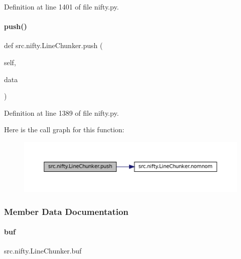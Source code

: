 Definition at line 1401 of file nifty.\+py.

\mbox{\label{classsrc_1_1nifty_1_1LineChunker_ad40b3d34790aa79d65c2e6984d936f16}} 
\paragraph{\texorpdfstring{push()}{push()}}
{\footnotesize\ttfamily def src.\+nifty.\+Line\+Chunker.\+push (\begin{DoxyParamCaption}\item[{}]{self,  }\item[{}]{data }\end{DoxyParamCaption})}



Definition at line 1389 of file nifty.\+py.

Here is the call graph for this function\+:
\nopagebreak
\begin{figure}[H]
\begin{center}
\leavevmode
\includegraphics[width=350pt]{classsrc_1_1nifty_1_1LineChunker_ad40b3d34790aa79d65c2e6984d936f16_cgraph}
\end{center}
\end{figure}


\subsubsection{Member Data Documentation}
\mbox{\label{classsrc_1_1nifty_1_1LineChunker_ac19d331e76548f84d0c6ed49086109ac}} 
\paragraph{\texorpdfstring{buf}{buf}}
{\footnotesize\ttfamily src.\+nifty.\+Line\+Chunker.\+buf}



